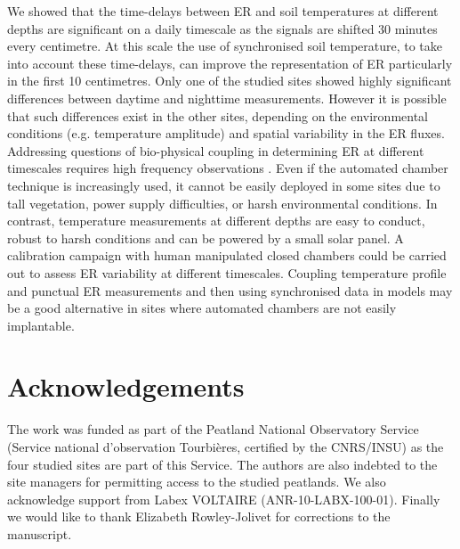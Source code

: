 We showed that the time-delays between ER and soil temperatures at different depths are significant on a daily timescale as the signals are shifted 30 minutes every centimetre.
At this scale the  use of synchronised soil temperature, to take into account these time-delays, can improve the representation of ER particularly in the first 10 centimetres.
Only one of the studied sites showed highly significant differences between daytime and nighttime measurements.
However it is possible that such differences exist in the other sites, depending on the environmental conditions (e.g. temperature amplitude) and spatial variability in the ER fluxes.
Addressing questions of bio-physical coupling in determining ER at different timescales requires high frequency observations \citep{Vargas2011}.
Even if the automated chamber technique is increasingly used, it cannot be easily deployed in some sites due to tall vegetation, power supply difficulties, or harsh environmental conditions.
In contrast, temperature measurements at different depths are easy to conduct, robust to harsh conditions and can be powered by a small solar panel.
A calibration campaign with human manipulated closed chambers could be carried out to assess ER variability at different timescales.
Coupling temperature profile and punctual ER measurements and then using synchronised data in models may be a good alternative in sites where automated chambers are not easily implantable.

\section*{Acknowledgements}
The work was funded as part of the Peatland National Observatory Service (Service national d'observation Tourbi\`eres, certified by the CNRS/INSU) as the four studied sites are part of this Service. The authors are also indebted to the site managers for permitting access to the studied peatlands. We also acknowledge support from Labex VOLTAIRE (ANR-10-LABX-100-01). Finally we would like to thank Elizabeth Rowley-Jolivet for corrections to the manuscript.